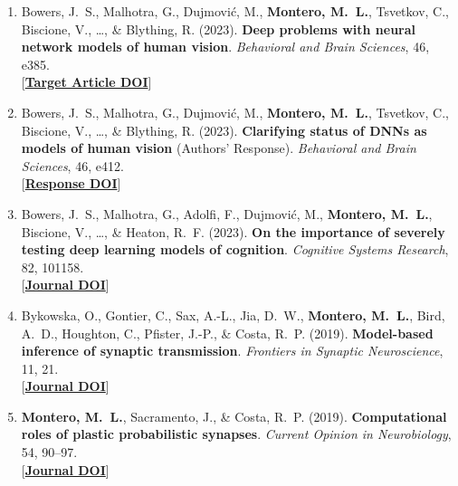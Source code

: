 \documentclass[10pt,a4paper]{article}
\newcommand{\linkbadge}[2]{%
  \textcolor{tagcolor}{[}\href{#2}{\textbf{#1}}\textcolor{tagcolor}{]}%
}
\begin{document}
\begin{enumerate}[leftmargin=1.6em, itemsep=0.45em]
    \item Bowers, J.~S., Malhotra, G., Dujmovi\'{c}, M., \textbf{Montero, M.~L.}, Tsvetkov, C., Biscione, V., \dots, \& Blything, R. (2023). \textbf{Deep problems with neural network models of human vision}. \textit{Behavioral and Brain Sciences}, 46, e385. \\
    \linkbadge{Target Article DOI}{https://doi.org/10.1017/S0140525X22002813}

    \item Bowers, J.~S., Malhotra, G., Dujmovi\'{c}, M., \textbf{Montero, M.~L.}, Tsvetkov, C., Biscione, V., \dots, \& Blything, R. (2023). \textbf{Clarifying status of DNNs as models of human vision} (Authors' Response). \textit{Behavioral and Brain Sciences}, 46, e412. \\
    \linkbadge{Response DOI}{https://doi.org/10.1017/S0140525X23002777}

    \item Bowers, J.~S., Malhotra, G., Adolfi, F., Dujmovi\'{c}, M., \textbf{Montero, M.~L.}, Biscione, V., \dots, \& Heaton, R.~F. (2023). \textbf{On the importance of severely testing deep learning models of cognition}. \textit{Cognitive Systems Research}, 82, 101158. \\
    \linkbadge{Journal DOI}{https://doi.org/10.1016/j.cogsys.2023.101158}

    \item Bykowska, O., Gontier, C., Sax, A.-L., Jia, D.~W., \textbf{Montero, M.~L.}, Bird, A.~D., Houghton, C., Pfister, J.-P., \& Costa, R.~P. (2019). \textbf{Model-based inference of synaptic transmission}. \textit{Frontiers in Synaptic Neuroscience}, 11, 21. \\
    \linkbadge{Journal DOI}{https://doi.org/10.3389/fnsyn.2019.00021}

    \item \textbf{Montero, M.~L.}, Sacramento, J., \& Costa, R.~P. (2019). \textbf{Computational roles of plastic probabilistic synapses}. \textit{Current Opinion in Neurobiology}, 54, 90--97. \\
    \linkbadge{Journal DOI}{https://doi.org/10.1016/j.conb.2018.09.002}
\end{enumerate}
\end{document}
